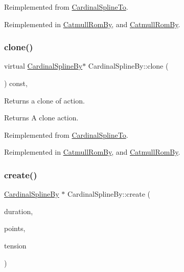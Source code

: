 Reimplemented from \hyperlink{classCardinalSplineTo_aed2a776edc3e26b2ba7524230edf42de}{Cardinal\+Spline\+To}.



Reimplemented in \hyperlink{classCatmullRomBy_aea28e624bd562521e444af38384470aa}{Catmull\+Rom\+By}, and \hyperlink{classCatmullRomBy_a972f2e516b44eaa141ae270f575024e5}{Catmull\+Rom\+By}.

\mbox{\label{classCardinalSplineBy_abe6e897500669708f01d42fd97226a02}} 
\subsubsection{\texorpdfstring{clone()}{clone()}\hspace{0.1cm}{\footnotesize\ttfamily [2/2]}}
{\footnotesize\ttfamily virtual \hyperlink{classCardinalSplineBy}{Cardinal\+Spline\+By}$\ast$ Cardinal\+Spline\+By\+::clone (\begin{DoxyParamCaption}\item[{void}]{ }\end{DoxyParamCaption}) const\hspace{0.3cm}{\ttfamily [override]}, {\ttfamily [virtual]}}

Returns a clone of action.

\begin{DoxyReturn}{Returns}
A clone action. 
\end{DoxyReturn}


Reimplemented from \hyperlink{classCardinalSplineTo_aed2a776edc3e26b2ba7524230edf42de}{Cardinal\+Spline\+To}.



Reimplemented in \hyperlink{classCatmullRomBy_aea28e624bd562521e444af38384470aa}{Catmull\+Rom\+By}, and \hyperlink{classCatmullRomBy_a972f2e516b44eaa141ae270f575024e5}{Catmull\+Rom\+By}.

\mbox{\label{classCardinalSplineBy_ac91380c9ea7b3209fe20d13995515bd2}} 
\subsubsection{\texorpdfstring{create()}{create()}\hspace{0.1cm}{\footnotesize\ttfamily [1/2]}}
{\footnotesize\ttfamily \hyperlink{classCardinalSplineBy}{Cardinal\+Spline\+By} $\ast$ Cardinal\+Spline\+By\+::create (\begin{DoxyParamCaption}\item[{float}]{duration,  }\item[{\hyperlink{classPointArray}{Point\+Array} $\ast$}]{points,  }\item[{float}]{tension }\end{DoxyParamCaption})\hspace{0.3cm}{\ttfamily [static]}}

